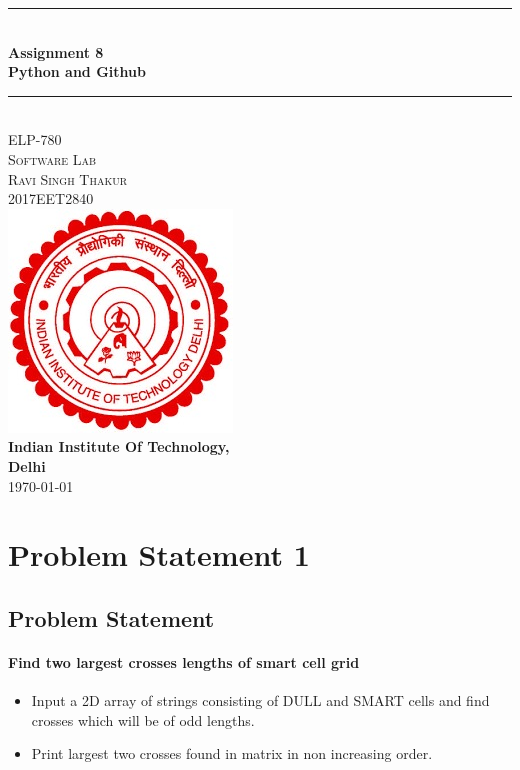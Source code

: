 \documentclass[11pt]{article}
\newcommand{\HRule}{\rule{\linewidth}{0.6mm}}
\begin{document}
\begin{titlepage}
\center %
\HRule \\[0.4cm]
\textbf{\huge Assignment 8}\\[0.3cm] %
\textbf{\huge Python and Github}\\[0.3cm]
\HRule \\[1cm]


\textsc{\Large ELP-780}\\[0.4cm] %
\textsc{\huge Software Lab}\\[1cm] %
\textsc{\Large Ravi Singh Thakur}\\ [0.16cm]
\textsc{\Large 2017EET2840}\\[1cm]
\includegraphics[scale=1.25]{logo.jpg}\\[1cm]
\textbf{\Large Indian Institute Of Technology,}\\[0.2cm]
\textbf{\Large Delhi}\\[0.3cm]
{\Large \today}\\[3cm] %
\end{titlepage}
\pagebreak

\tableofcontents

\newpage


\section{Problem Statement 1}
{

\subsection{Problem Statement}
\paragraph{ Find two largest crosses lengths of smart cell grid} 
\begin{itemize}
\item Input a 2D array of strings consisting of DULL and SMART cells and find crosses which will be of odd lengths.
\item Print largest two crosses found in matrix in non increasing order.
\end{itemize}
}
\end{document}
